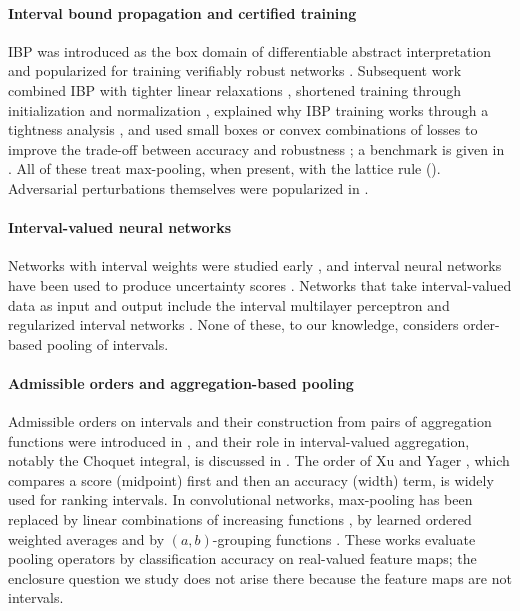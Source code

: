 \documentclass[preprint,12pt]{elsarticle}
\theoremstyle{definition}
\begin{document}
\paragraph{Interval bound propagation and certified training} IBP was introduced as the box domain of differentiable abstract interpretation \cite{mirman2018} and popularized for training verifiably robust networks \cite{gowal2018}. Subsequent work combined IBP with tighter linear relaxations \cite{zhang2020crownibp}, shortened training through initialization and normalization \cite{shi2021}, explained why IBP training works through a tightness analysis \cite{mao2024}, and used small boxes or convex combinations of losses to improve the trade-off between accuracy and robustness \cite{muller2023sabr,depalma2024}; a benchmark is given in \cite{mao2024ctbench}. All of these treat max-pooling, when present, with the lattice rule (). Adversarial perturbations themselves were popularized in \cite{goodfellow2015}.

\paragraph{Interval-valued neural networks} Networks with interval weights were studied early \cite{kwon1994}, and interval neural networks have been used to produce uncertainty scores \cite{oala2020}. Networks that take interval-valued data as input and output include the interval multilayer perceptron \cite{roque2007} and regularized interval networks \cite{yang2019rann}. None of these, to our knowledge, considers order-based pooling of intervals.

\paragraph{Admissible orders and aggregation-based pooling} Admissible orders on intervals and their construction from pairs of aggregation functions were introduced in \cite{bustince2013orders}, and their role in interval-valued aggregation, notably the Choquet integral, is discussed in \cite{bustince2013choquet}. The order of Xu and Yager \cite{xu2006}, which compares a score (midpoint) first and then an accuracy (width) term, is widely used for ranking intervals. In convolutional networks, max-pooling has been replaced by linear combinations of increasing functions \cite{rodriguez2022}, by learned ordered weighted averages \cite{forcen2020} and by $(a,b)$-grouping functions \cite{rodriguez2023}. These works evaluate pooling operators by classification accuracy on real-valued feature maps; the enclosure question we study does not arise there because the feature maps are not intervals.
\end{document}
